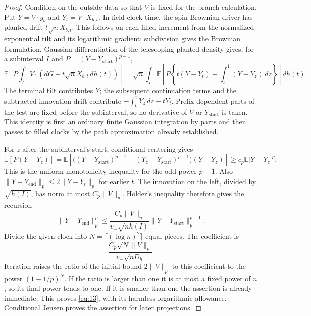 \begin{proof}
Condition on the outside data so that $V$ is fixed for the branch
calculation.  Put $Y=V\cdot y_b$ and $Y_t=V\cdot X_{b,t}$.
In field-clock time, the spin Brownian driver has planted drift
$t\sqrt n X_{b,t}$.  This follows on each filled increment from the
normalized exponential tilt and its logarithmic gradient; subdivision
gives the Brownian formulation.  Gaussian differentiation of the
telescoping planted density gives, for a subinterval $I$ and
$P=(Y-Y_{\mathrm{start}})^{p-1}$,
\[
 \mathbb E\left[P\int_I V\cdot(dG-t\sqrt n X_{b,t}\,dh(t))\right]
 =\sqrt n\int_I\mathbb E\left[
 P\left\{t(Y-Y_t)+\int_t^1(Y-Y_z)\,dz\right\}\right]dh(t).
\]
The terminal tilt contributes $Y$; the subsequent continuation terms
and the subtracted innovation drift contribute
$-\int_t^1Y_z\,dz-tY_t$.  Prefix-dependent parts of the test are fixed
before the subinterval, so no derivative of $V$ or
$Y_{\mathrm{start}}$ is taken.  This identity is first an ordinary
finite Gaussian integration by parts and then passes to filled clocks
by the path approximation already established.

For $z$ after the subinterval's start, conditional centering gives
\[
 \mathbb E[P(Y-Y_z)]
 =\mathbb E\left[
 \bigl((Y-Y_{\mathrm{start}})^{p-1}
       -(Y_z-Y_{\mathrm{start}})^{p-1}\bigr)(Y-Y_z)\right]
 \ge c_p\mathbb E|Y-Y_z|^p.
\]
This is the uniform monotonicity inequality for the odd power $p-1$.
Also $\|Y-Y_{\mathrm{end}}\|_p\le2\|Y-Y_t\|_p$ for earlier $t$.
The innovation on the left, divided by $\sqrt{h(I)}$, has norm at
most $C_p\|V\|_p$.  H\"older's inequality therefore gives the recursion
\[
 \|Y-Y_{\mathrm{end}}\|_p^p
 \le \frac{C_p\|V\|_p}{v_-\sqrt{nh(I)}}
       \|Y-Y_{\mathrm{start}}\|_p^{p-1}.
\]
Divide the given clock into $N=\lceil(\log n)^2\rceil$ equal pieces.
The coefficient is
\[
 \frac{C_p\sqrt N\|V\|_p}{v_-\sqrt{nD_h}}.
\]
Iteration raises the ratio of the initial bound $2\|V\|_p$ to this
coefficient to the power $(1-1/p)^N$.  If the ratio is larger than one
it is at most a fixed power of $n$, so its final power tends to one.
If it is smaller than one the assertion is already immediate.
This proves \eqref{eq:13}, with its harmless logarithmic allowance.
Conditional Jensen proves the assertion for later projections.
\end{proof}

